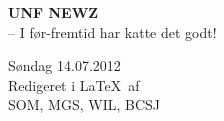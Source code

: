 \begin{minipage}[b]{0.35\linewidth}
\Huge \textbf{UNF NEWZ} \\
\Large -- I før-fremtid har katte det godt!
\end{minipage}
\begin{minipage}[b]{0.4\linewidth}
\Large Søndag 14.07.2012 \\
\normalsize Redigeret i \LaTeX\ af \\ SOM, MGS, WIL, BCSJ

\end{minipage}